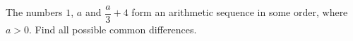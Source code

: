 The numbers $1$, $a$ and $\dfrac a3+4$ form an arithmetic sequence in some order, where $a>0$. Find all possible common differences.
